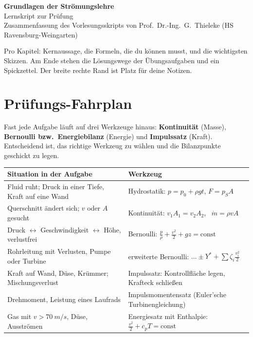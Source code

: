 \documentclass[11pt,a4paper]{article}
\begin{document}
\begin{center}
{\sffamily\bfseries\huge\color{acc} Grundlagen der Strömungslehre}\\[4pt]
{\sffamily\Large Lernskript zur Prüfung}\\[6pt]
{\small Zusammenfassung des Vorlesungsskripts von Prof.\ Dr.-Ing.\ G.\ Thieleke (HS Ravensburg-Weingarten)}
\end{center}

\vspace{4pt}
Pro Kapitel: Kernaussage, die Formeln, die du können musst, und die wichtigsten Skizzen. Am Ende stehen die Lösungswege der Übungsaufgaben und ein Spickzettel. Der breite rechte Rand ist Platz für deine Notizen.

\tableofcontents

\section{Prüfungs-Fahrplan}

Fast jede Aufgabe läuft auf drei Werkzeuge hinaus: \textbf{Kontinuität} (Masse), \textbf{Bernoulli bzw.\ Energiebilanz} (Energie) und \textbf{Impulssatz} (Kraft). Entscheidend ist, das richtige Werkzeug zu wählen und die Bilanzpunkte geschickt zu legen.

\begin{center}
\renewcommand{\arraystretch}{1.35}
\begin{tabularx}{\linewidth}{>{\raggedright\arraybackslash}X >{\raggedright\arraybackslash}X}
\toprule
\textbf{Situation in der Aufgabe} & \textbf{Werkzeug} \\ \midrule
Fluid ruht; Druck in einer Tiefe, Kraft auf eine Wand & Hydrostatik: $p = p_0 + \rho g t$, $F = p_S A$ \\
Querschnitt ändert sich; $v$ oder $A$ gesucht & Kontinuität: $v_1 A_1 = v_2 A_2$, \ $\dot m = \rho v A$ \\
Druck $\leftrightarrow$ Geschwindigkeit $\leftrightarrow$ Höhe, verlustfrei & Bernoulli: $\frac{p}{\rho} + \frac{v^2}{2} + g z = \text{const}$ \\
Rohrleitung mit Verlusten, Pumpe oder Turbine & erweiterte Bernoulli: $\ldots \pm Y^* + \sum \zeta_i \frac{v_i^2}{2}$ \\
Kraft auf Wand, Düse, Krümmer; Mischungsverlust & Impulssatz: Kontrollfläche legen, Krafteck schließen \\
Drehmoment, Leistung eines Laufrads & Impulsmomentensatz (Euler'sche Turbinengleichung) \\
Gas mit $v > \SI{70}{m/s}$, Düse, Ausströmen & Energiesatz mit Enthalpie: $\frac{v^2}{2} + c_p T = \text{const}$ \\
\bottomrule
\end{tabularx}
\end{center}
\end{document}
